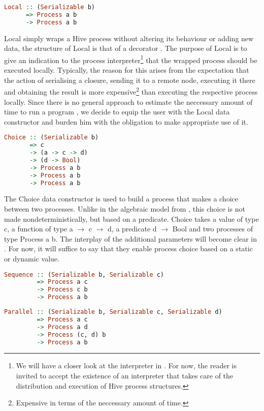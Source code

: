 \begin{lstlisting}[language=Haskell]
Local :: (Serializable b) 
      => Process a b
      -> Process a b
\end{lstlisting}
\textsf{Local} simply wraps a Hive process without altering its behaviour or adding new data, the structure of \textsf{Local} is that of a decorator \cite{Gamma:1995:DPE:186897}. The purpose of \textsf{Local} is to give an indication to the process interpreter\footnote{We will have a closer look at the interpreter in . For now, the reader is invited to accept the existence of an interpreter that takes care of the distribution and execution of Hive process structures.} that the wrapped process should be executed locally. Typically, the reason for this arises from the expectation that the action of serialising a closure, sending it to a remote node, executing it there and obtaining the result is more expensive\footnote{Expensive in terms of the neccessary amount of time.} than executing the respective process locally. Since there is no general approach to estimate the neccessary amount of time to run a program \cite{}, we decide to equip the user with the \textsf{Local} data constructor and burden him with the obligation to make appropriate use of it.

\begin{lstlisting}[language=Haskell]
Choice :: (Serializable b)
       => c
       -> (a -> c -> d)
       -> (d -> Bool)
       -> Process a b
       -> Process a b
       -> Process a b
\end{lstlisting}
The \textsf{Choice} data constructor is used to build a process that makes a choice between two processes. Unlike in the algebraic model from , this choice is not made nondeterministically, but based on a predicate. \textsf{Choice} takes a value of type \textsf{c}, a function of type \textsf{a $\to$ c $\to$ d}, a predicate \textsf{d $\to$ Bool} and two processes of type \textsf{Process a b}. The interplay of the additional parameters will become clear in . For now, it will suffice to say that they enable process choice based on a static or dynamic value.

\begin{lstlisting}[language=Haskell]
Sequence :: (Serializable b, Serializable c)
         => Process a c
         -> Process c b
         -> Process a b
\end{lstlisting}

\begin{lstlisting}[language=Haskell]
Parallel :: (Serializable b, Serializable c, Serializable d)
         => Process a c
         -> Process a d
         -> Process (c, d) b
         -> Process a b
\end{lstlisting}

